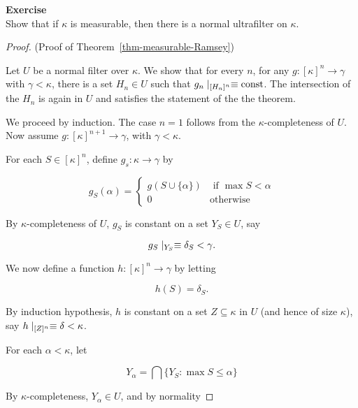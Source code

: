 \begin{framed}
\textbf{Exercise}\\
Show that if $\kappa$ is measurable, then there is a normal ultrafilter on $\kappa$.
\end{framed}

\begin{proof}(Proof of Theorem~\ref{thm-measurable-Ramsey})

Let $U$ be a normal filter over $\kappa$.
We show that for every $n$, for any $g: [\kappa]^n \to \gamma$ with $\gamma < \kappa$, there is a set $H_n \in U$ such that $g_n \mid_{[H_n]^n} \equiv \text{const}$. The intersection of the $H_n$ is again in $U$ and satisfies the statement of the the theorem.

We proceed by induction. The case $n=1$ follows from the $\kappa$-completeness of $U$. Now assume $g:[\kappa]^{n+1} \to \gamma$, with $\gamma < \kappa$.

For each $S \in [\kappa]^n$, define $g_s : \kappa \to \gamma$ by

\begin{equation}
g_S(\alpha) = \begin{cases}
        g(S \cup \{\alpha\}) & \text{ if } \max S < \alpha \\
        0 & \text{otherwise}
    \end{cases}
\end{equation}

By $\kappa$-completeness of $U$, $g_S$ is constant on a set $Y_S \in U$, say

\begin{equation}
g_S\mid_{Y_S} \equiv \delta_S < \gamma.
\end{equation}

We now define a function $h: [\kappa]^n \to \gamma$
by letting

\begin{equation}
h(S) = \delta_S.
\end{equation}

By induction hypothesis, $h$ is constant on a set $Z \subseteq \kappa$
in $U$ (and hence of size $\kappa$), say $h\mid_{[Z]^n} \equiv \delta < \kappa$.

For each $\alpha < \kappa$, let

\begin{equation}
Y_\alpha = \bigcap \{Y_S \colon \max S \leq \alpha\}
\end{equation}

By $\kappa$-completeness, $Y_\alpha \in U$, and by normality


\end{proof}
